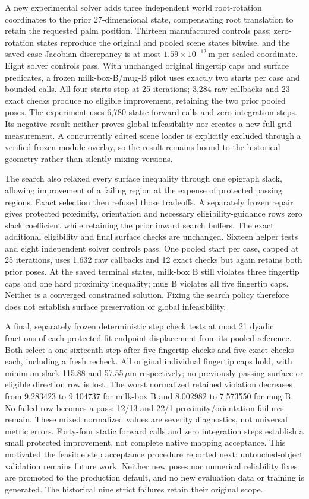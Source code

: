 A new experimental solver adds three independent world root-rotation
coordinates to the prior 27-dimensional state, compensating root translation
to retain the requested palm position. Thirteen manufactured controls pass;
zero-rotation states reproduce the original and pooled scene states bitwise,
and the saved-case Jacobian discrepancy is at most
$1.59\times10^{-12}$\,m per scaled coordinate. Eight solver controls pass.
With unchanged original fingertip caps and surface predicates, a frozen
milk-box-B/mug-B pilot uses exactly two starts per case and bounded calls.
All four starts stop at 25 iterations; 3,284 raw callbacks and 23 exact checks
produce no eligible improvement, retaining the two prior pooled poses.
The experiment uses 6,780 static forward calls and zero integration steps.
Its negative result neither proves global infeasibility nor creates a new
full-grid measurement. A concurrently edited scene loader is explicitly
excluded through a verified frozen-module overlay, so the result remains
bound to the historical geometry rather than silently mixing versions.

The search also relaxed every surface inequality through one epigraph slack,
allowing improvement of a failing region at the expense of protected passing
regions. Exact selection then refused those tradeoffs. A separately frozen
repair gives protected proximity, orientation and necessary eligibility-guidance
rows zero slack coefficient while retaining the prior inward search buffers.
The exact additional eligibility and final surface checks are unchanged.
Sixteen helper tests and eight independent solver controls pass. One pooled
start per case, capped at 25 iterations, uses 1,632 raw callbacks and 12 exact
checks but again retains both prior poses. At the saved terminal states,
milk-box B still violates three fingertip caps and one hard proximity
inequality; mug B violates all five fingertip caps. Neither is a converged
constrained solution. Fixing the search policy therefore does not establish
surface preservation or global infeasibility.

A final, separately frozen deterministic step check tests at most 21 dyadic
fractions of each protected-fit endpoint displacement from its pooled reference.
Both select a one-sixteenth step after five fingertip checks and five exact
checks each, including a fresh recheck. All original individual fingertip caps
hold, with minimum slack 115.88 and 57.55\,$\mu$m respectively; no previously
passing surface or eligible direction row is lost. The worst normalized
retained violation decreases from 9.283423 to 9.104737 for milk-box B and
8.002982 to 7.573550 for mug B. No failed row becomes a pass: 12/13 and 22/1
proximity/orientation failures remain. These mixed normalized values are
severity diagnostics, not universal metric errors. Forty-four static forward
calls and zero integration steps establish a small protected improvement, not
complete native mapping acceptance. This motivated the feasible step
acceptance procedure reported next; untouched-object validation remains
future work. Neither new poses nor numerical reliability fixes are
promoted to the production default, and no new evaluation data or training is
generated. The historical nine strict failures retain their original scope.


